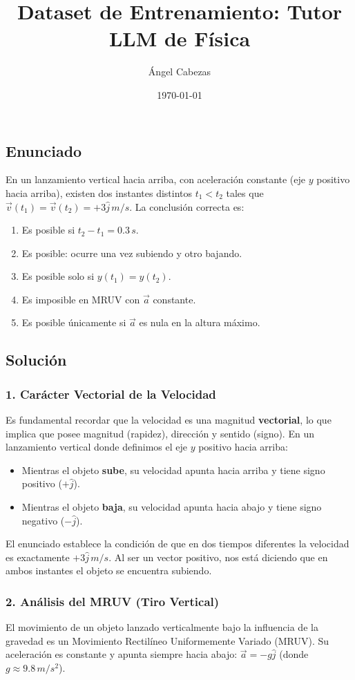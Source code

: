 \documentclass[12pt, a4paper]{article}
\title{Dataset de Entrenamiento: Tutor LLM de Física}
\author{Ángel Cabezas}
\date{\today}
\begin{document}
\subsection*{Enunciado}
En un lanzamiento vertical hacia arriba, con aceleración constante (eje $y$ positivo hacia arriba), existen dos instantes distintos $t_1 < t_2$ tales que $\vec{v}(t_1) = \vec{v}(t_2) = +3\hat{j} \, \si{m/s}$. La conclusión correcta es:

\begin{enumerate}[label=\alph*)]
    \item Es posible si $t_2 - t_1 = 0.3 \, \si{s}$.
    \item Es posible: ocurre una vez subiendo y otro bajando.
    \item Es posible solo si $y(t_1) = y(t_2)$.
    \item Es imposible en MRUV con $\vec{a}$ constante.
    \item Es posible únicamente si $\vec{a}$ es nula en la altura máximo.
\end{enumerate}

\subsection*{Solución}

\subsubsection*{1. Carácter Vectorial de la Velocidad}
Es fundamental recordar que la velocidad es una magnitud \textbf{vectorial}, lo que implica que posee magnitud (rapidez), dirección y sentido (signo). 
En un lanzamiento vertical donde definimos el eje $y$ positivo hacia arriba:
\begin{itemize}
    \item Mientras el objeto \textbf{sube}, su velocidad apunta hacia arriba y tiene signo positivo ($+\hat{j}$).
    \item Mientras el objeto \textbf{baja}, su velocidad apunta hacia abajo y tiene signo negativo ($-\hat{j}$).
\end{itemize}

El enunciado establece la condición de que en dos tiempos diferentes la velocidad es exactamente $+3\hat{j} \, \si{m/s}$. Al ser un vector positivo, nos está diciendo que en ambos instantes el objeto se encuentra subiendo.

\subsubsection*{2. Análisis del MRUV (Tiro Vertical)}
El movimiento de un objeto lanzado verticalmente bajo la influencia de la gravedad es un Movimiento Rectilíneo Uniformemente Variado (MRUV). Su aceleración es constante y apunta siempre hacia abajo: $\vec{a} = -g\hat{j}$ (donde $g \approx 9.8 \, \si{m/s^2}$).
\end{document}
